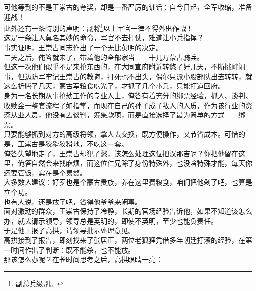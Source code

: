 \begin{multicols}{\theparacolNo}
可他等到的不是王崇古的夸奖，却是一番严厉的训话：自今日起，全军收缩，准备迎战！\\

此外还有一条特别的声明：副将\footnote{副总兵级别。}以上军官一律不得外出作战！\\

这是一条让人莫名其妙的命令，军官不去打仗，难道让小兵指挥？\\

事实证明，王崇古同志作出了一个无比英明的决定。\\

三天之后，俺答就来了，带着他的全部家当——十几万蒙古骑兵。\\

但这一次他们似乎不是来抢东西的，在大同宣府附近转悠了好几天，不断挑衅闹事，但边防军牢记王崇古的教诲，打死也不出头，偶尔只派小股部队出去转转，就这么折腾了几天，蒙古军粮食吃光了，才抓了几个小兵，只能打道回府。\\

身为一名长期从事抢劫工作的专业人士，俺答有着充分的绑票经验，抓人、谈判、收赎金一整套流程了如指掌，而现在自己的孙子成了敌人的人质，作为该行业的资深从业人员，他没有去谈判，筹集款项，而是直接选择了最为简单的方式——绑票。\\

只要能够抓到对方的高级将领，拿人去交换，既方便操作，又节省成本。可惜的是，王崇古是狡猾狡猾地，不吃这一套。\\

俺答失望地走了，王崇古却犯了愁，该怎么处理这位把汉那吉呢？你把他留在这里，俺答自然会来找麻烦，而这位仁兄除了身份特殊外，也没啥特殊才能，每天你还要管饭，实在是个累赘。\\

大多数人建议：好歹也是个蒙古贵族，养在这里费粮食，咱们把他剁了吧，也算是立个功。\\

也有人说，还是放了吧，省得他爷爷来闹事。\\

面对激动的群众，王崇古保持了冷静，长期的官场经验告诉他，如果不知道该怎么办，就去请示领导，领导总是英明的，即使不英明，至少也能负责任。\\

于是他上报了高拱，请领导批示处理意见。\\

高拱接到了报告，即刻找来了张居正，两位老狐狸凭借多年朝廷打滚的经验，在第一时间作出了判断：既不能杀，也不能放。\\

那该怎么办呢？在长时间思考之后，高拱眼睛一亮：\\


\end{multicols}
